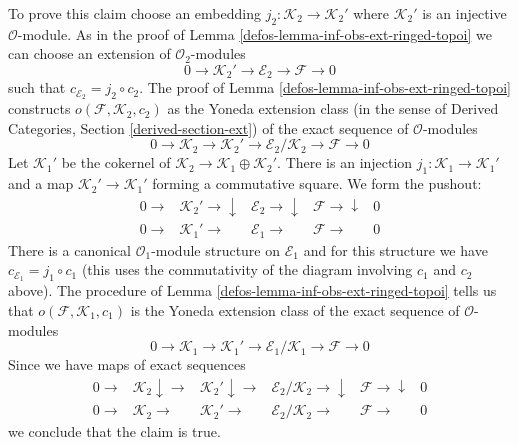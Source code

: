 \begin{remark}
\medskip\noindent
To prove this claim choose an embedding
$j_2 : \mathcal{K}_2 \to \mathcal{K}_2'$
where $\mathcal{K}_2'$ is an injective $\mathcal{O}$-module.
As in the proof of Lemma \ref{defos-lemma-inf-obs-ext-ringed-topoi}
we can choose an extension of $\mathcal{O}_2$-modules
$$
0 \to \mathcal{K}_2' \to \mathcal{E}_2 \to \mathcal{F} \to 0
$$
such that $c_{\mathcal{E}_2} = j_2 \circ c_2$.
The proof of Lemma \ref{defos-lemma-inf-obs-ext-ringed-topoi} constructs
$o(\mathcal{F}, \mathcal{K}_2, c_2)$
as the Yoneda extension class (in the sense of
Derived Categories, Section \ref{derived-section-ext})
of the exact sequence of $\mathcal{O}$-modules
$$
0 \to
\mathcal{K}_2 \to \mathcal{K}_2' \to
\mathcal{E}_2/\mathcal{K}_2 \to
\mathcal{F} \to 0
$$
Let $\mathcal{K}_1'$ be the cokernel of
$\mathcal{K}_2 \to \mathcal{K}_1 \oplus \mathcal{K}_2'$.
There is an injection $j_1 : \mathcal{K}_1 \to \mathcal{K}_1'$
and a map $\mathcal{K}_2' \to \mathcal{K}_1'$ forming
a commutative square. We form the pushout:
$$
\begin{array}{ccccc}0 \longrightarrow & \mathcal{K}_2' \longrightarrow\downarrow & \mathcal{E}_2 \longrightarrow\downarrow & \mathcal{F} \longrightarrow\downarrow & 0 \\ 0 \longrightarrow & \mathcal{K}_1' \longrightarrow & \mathcal{E}_1 \longrightarrow & \mathcal{F} \longrightarrow & 0\end{array}
$$
There is a canonical $\mathcal{O}_1$-module structure on
$\mathcal{E}_1$ and for this structure we have
$c_{\mathcal{E}_1} = j_1 \circ c_1$ (this uses the commutativity
of the diagram involving $c_1$ and $c_2$ above).
The procedure of Lemma \ref{defos-lemma-inf-obs-ext-ringed-topoi}
tells us that $o(\mathcal{F}, \mathcal{K}_1, c_1)$
is the Yoneda extension class of the exact sequence
of $\mathcal{O}$-modules
$$
0 \to
\mathcal{K}_1 \to
\mathcal{K}_1' \to
\mathcal{E}_1/\mathcal{K}_1 \to
\mathcal{F} \to 0
$$
Since we have maps of exact sequences
$$
\begin{array}{cccccc}0 \longrightarrow & \mathcal{K}_2 \downarrow\longrightarrow & \mathcal{K}_2' \downarrow\longrightarrow & \mathcal{E}_2/\mathcal{K}_2 \longrightarrow\downarrow & \mathcal{F} \longrightarrow\downarrow & 0 \\ 0 \longrightarrow & \mathcal{K}_2 \longrightarrow & \mathcal{K}_2' \longrightarrow & \mathcal{E}_2/\mathcal{K}_2 \longrightarrow & \mathcal{F} \longrightarrow & 0\end{array}
$$
we conclude that the claim is true.
\end{remark}

